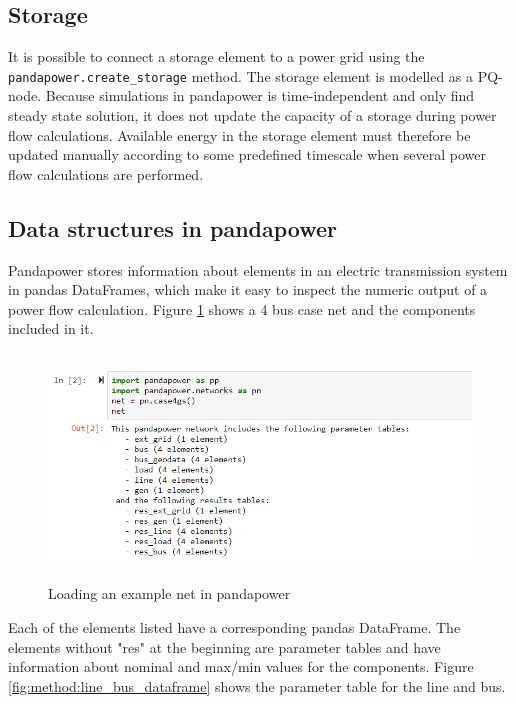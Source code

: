 \documentclass[class=book, crop=false]{standalone}
\begin{document}
\subsection*{Storage}
It is possible to connect a storage element to a power grid using the \texttt{pandapower.create\_storage} method. The storage element is modelled as a PQ-node. Because simulations in pandapower is time-independent and only find steady state solution, it does not update the capacity of a storage during power flow calculations. Available energy in the storage element must therefore be updated manually according to some predefined timescale when several power flow calculations are performed.  


\subsection{Data structures in pandapower}

Pandapower stores information about elements in an electric transmission system in pandas DataFrames, which make it easy to inspect the numeric output of a power flow calculation. Figure \ref{fig:method:loading_example_net} shows a 4 bus case net and the components included in it. 

\begin{figure}[H]
    \center
    \includegraphics[height=6cm, width=12cm]{figures/case4g_show_net.PNG}
    \caption[size = 9]{Loading an example net in pandapower}
    \label{fig:method:loading_example_net}
\end{figure}
Each of the elements listed have a corresponding pandas DataFrame. The elements without "res" at the beginning are parameter tables and have information about nominal and max/min values for the components. Figure \ref{fig:method:line_bus_dataframe} shows the parameter table for the line and bus.
\end{document}
